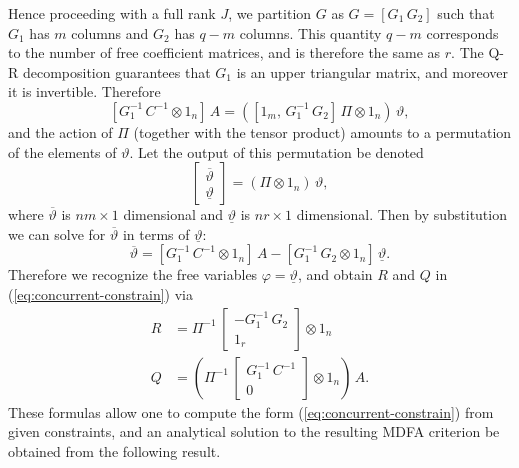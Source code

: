 \documentclass[a4paper]{book}
\begin{document}
 Hence  proceeding with a full rank $J$, we partition $G$ as $G = [ G_1 \, G_2]$ 
 such that $G_1$ has $m$ columns and $G_2$
 has $q-m$ columns.  This quantity $q-m$ corresponds to the number 
 of free coefficient matrices, and is therefore the same as $r$.
 The Q-R decomposition guarantees that $G_1$ is an upper triangular matrix, 
 and moreover it is invertible.  Therefore
\[
  \left[ G_1^{-1} \, C^{-1} \otimes 1_n \right] \, A  = 
  \left( \left[ 1_m , \, G_1^{-1} \, G_2 \right] \, \Pi \otimes 1_n  \right) \, \vartheta,
\]
 and the action of $\Pi$ (together with the tensor product) amounts 
 to a   permutation of the elements of $\vartheta$.
  Let the output of this permutation be denoted
\[
   \left[ \begin{array}{l} \overline{\vartheta} \\ \underline{\vartheta} \end{array} \right]
   = \left( \Pi \otimes 1_n \right) \, \vartheta,
\]
 where $\overline{\vartheta}$ is $n m \times 1$ dimensional and
 $\underline{\vartheta}$ is $n r \times 1$ dimensional.  
 Then  by substitution we can solve for $\overline{\vartheta}$ in terms 
 of $\underline{\vartheta}$:
\[
   \overline{\vartheta} =  \left[ G_1^{-1} \, C^{-1} \otimes 1_n \right] \, A - 
   \left[  G_1^{-1} \, G_2  \otimes 1_n   \right] \, \underline{\vartheta}.
\]
 Therefore we recognize the free variables $\varphi = \underline{\vartheta}$, 
 and obtain $R$ and $Q$ in (\ref{eq:concurrent-constrain}) via
\begin{align*}
   R & = \Pi^{-1} \, \left[ \begin{array}{c} - G_1^{-1} \, G_2 \\ 
   1_{r} \end{array} \right] \otimes 1_n  \\
  Q & = \left( \Pi^{-1}  \, \left[ \begin{array}{c}  G_1^{-1} \, C^{-1} \\ 0 \end{array} \right] \otimes 1_n  \right) \, A.
\end{align*}
  These formulas allow one to compute the   form (\ref{eq:concurrent-constrain}) 
   from given constraints, and
 an analytical solution to the resulting MDFA criterion  be obtained from the following result.
\end{document}
